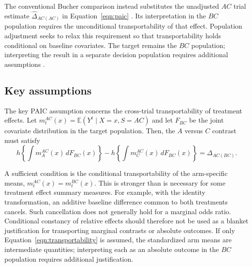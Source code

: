 \documentclass[article]{jss}
\begin{document}
The conventional Bucher comparison instead substitutes the unadjusted $AC$ trial estimate $\widehat\Delta_{AC(AC)}$ in Equation~\ref{eqn:paic} \citep{bucher1997results}. Its interpretation in the $BC$ population requires the unconditional transportability of that effect. Population adjustment seeks to relax this requirement so that transportability holds conditional on baseline covariates. The target remains the $BC$ population; interpreting the result in a separate decision population requires additional assumptions \citep{Phillippo2016DSU}.

\subsection{Key assumptions}
\label{sec:paic-assumptions}



The key PAIC assumption concerns the cross-trial transportability of treatment effects. Let $m_t^{AC}(x)=\mathbb{E}(Y^t\mid X=x,S=AC)$ and let $F_{BC}$ be the joint covariate distribution in the target population. Then, the $A$ versus $C$ contrast must satisfy
\begin{equation}
\label{eqn:transportability}
h\left\{\int m_A^{AC}(x)\,dF_{BC}(x)\right\}
-h\left\{\int m_C^{AC}(x)\,dF_{BC}(x)\right\}
=\Delta_{AC(BC)}.
\end{equation}

A sufficient condition is the conditional transportability of the arm-specific means, $m_t^{AC}(x)=m_t^{BC}(x)$. This is stronger than is necessary for some treatment effect summary measures. For example, with the identity transformation, an additive baseline difference common to both treatments cancels. Such cancellation does not generally hold for a marginal odds ratio. Conditional constancy of relative effects should therefore not be used as a blanket justification for transporting marginal contrasts or absolute outcomes. If only Equation~\ref{eqn:transportability} is assumed, the standardized arm means are intermediate quantities; interpreting each as an absolute outcome in the $BC$ population requires additional justification.
\end{document}
